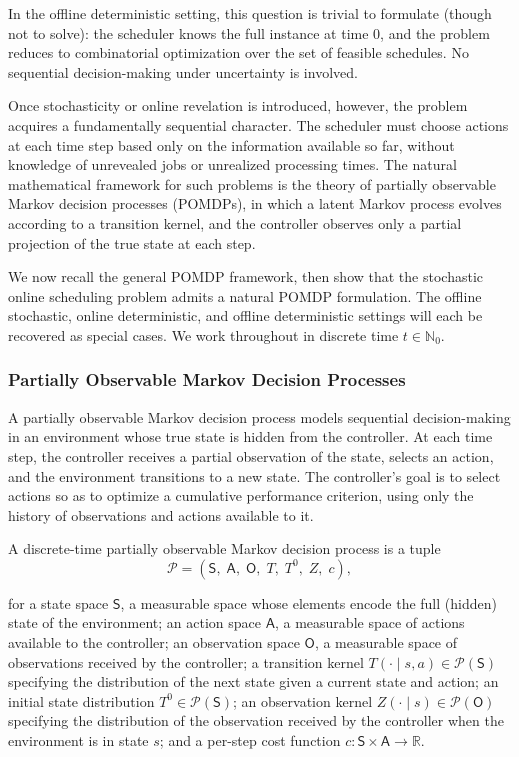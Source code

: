 In the offline deterministic setting, this question is trivial to formulate (though not to
solve): the scheduler knows the full instance at time $0$, and the problem reduces to
combinatorial optimization over the set of feasible schedules. No sequential
decision-making under uncertainty is involved.

Once stochasticity or online revelation is introduced, however, the problem acquires a
fundamentally sequential character. The scheduler must choose actions at each time step
based only on the information available so far, without knowledge of unrevealed jobs or
unrealized processing times. The natural mathematical framework for such problems is
the theory of partially observable Markov decision processes (POMDPs), in which a
latent Markov process evolves according to a transition kernel, and the controller
observes only a partial projection of the true state at each step.

We now recall the general POMDP framework, then show that the stochastic online
scheduling problem admits a natural POMDP formulation. The offline stochastic, online
deterministic, and offline deterministic settings will each be recovered as special cases.
We work throughout in discrete time $t \in \mathbb{N}_0$.

\subsubsection{Partially Observable Markov Decision Processes}

A partially observable Markov decision process models sequential decision-making in an
environment whose true state is hidden from the controller. At each time step, the
controller receives a partial observation of the state, selects an action, and the
environment transitions to a new state. The controller's goal is to select actions so as
to optimize a cumulative performance criterion, using only the history of observations
and actions available to it.

\begin{definition}[POMDP]
A discrete-time partially observable Markov decision process is a tuple
\[
\mathcal{P} = (\mathsf{S},\; \mathsf{A},\; \mathsf{O},\; T,\; T^0,\; Z,\; c),
\]

for a state space $\mathsf{S}$, a measurable space whose elements encode the full (hidden) state of the environment; an action space $\mathsf{A}$, a measurable space of actions available to the controller; an observation space $\mathsf{O}$, a measurable space of observations received by the controller; a transition kernel $T(\cdot \mid s, a) \in \mathcal{P}(\mathsf{S})$ specifying the distribution of the next state given a current state and action; an initial state distribution $T^0 \in \mathcal{P}(\mathsf{S})$; an observation kernel $Z(\cdot \mid s) \in \mathcal{P}(\mathsf{O})$ specifying the distribution of the observation received by the controller when the environment is in state $s$; and a per-step cost function $c : \mathsf{S} \times \mathsf{A} \to \mathbb{R}$.

\end{definition}

